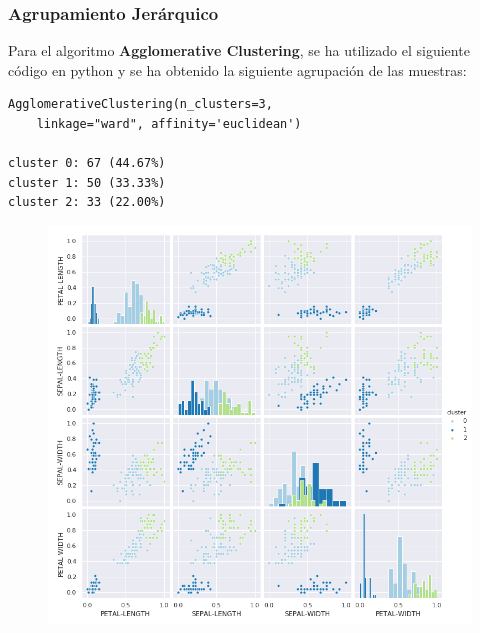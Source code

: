 \documentclass[spanish]{beamer}
\begin{document}
\begin{frame}[fragile]
\frametitle{Agrupamiento Jerárquico}
Para el algoritmo \textbf{Agglomerative Clustering}, se ha utilizado el siguiente código en python y se ha obtenido la siguiente agrupación de las muestras:\break
\begin{lstlisting}
AgglomerativeClustering(n_clusters=3, 
	linkage="ward", affinity='euclidean')

cluster 0: 67 (44.67%)
cluster 1: 50 (33.33%)
cluster 2: 33 (22.00%)
\end{lstlisting}
\end{frame}

\begin{frame}
\begin{figure}[h]
\centering
\includegraphics[scale=0.34]{dani/scatmatrixAggClusterIRIS.png}
\end{figure}
\end{frame}
\end{document}
